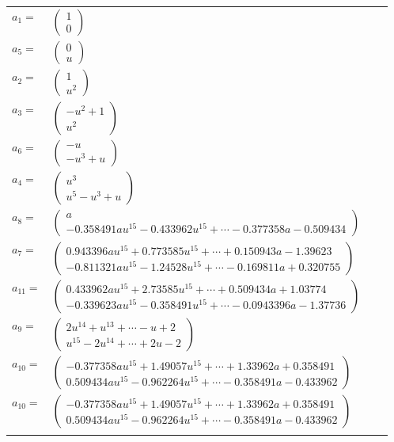 \documentclass[1p]{elsarticle_modified}
\theoremstyle{definition}
\begin{document}
\begin{tabular}{m{7pt} m{180pt} m{7pt} m{180pt} }
\flushright $a_{1}=$&$\begin{pmatrix}1\\0\end{pmatrix}$ \\
\flushright $a_{5}=$&$\begin{pmatrix}0\\u\end{pmatrix}$ \\
\flushright $a_{2}=$&$\begin{pmatrix}1\\u^2\end{pmatrix}$ \\
\flushright $a_{3}=$&$\begin{pmatrix}- u^2+1\\u^2\end{pmatrix}$ \\
\flushright $a_{6}=$&$\begin{pmatrix}- u\\- u^3+u\end{pmatrix}$ \\
\flushright $a_{4}=$&$\begin{pmatrix}u^3\\u^5- u^3+u\end{pmatrix}$ \\
\flushright $a_{8}=$&$\begin{pmatrix}a\\-0.358491 a u^{15}-0.433962 u^{15}+\cdots-0.377358 a-0.509434\end{pmatrix}$ \\
\flushright $a_{7}=$&$\begin{pmatrix}0.943396 a u^{15}+0.773585 u^{15}+\cdots+0.150943 a-1.39623\\-0.811321 a u^{15}-1.24528 u^{15}+\cdots-0.169811 a+0.320755\end{pmatrix}$ \\
\flushright $a_{11}=$&$\begin{pmatrix}0.433962 a u^{15}+2.73585 u^{15}+\cdots+0.509434 a+1.03774\\-0.339623 a u^{15}-0.358491 u^{15}+\cdots-0.0943396 a-1.37736\end{pmatrix}$ \\
\flushright $a_{9}=$&$\begin{pmatrix}2 u^{14}+u^{13}+\cdots- u+2\\u^{15}-2 u^{14}+\cdots+2 u-2\end{pmatrix}$ \\
\flushright $a_{10}=$&$\begin{pmatrix}-0.377358 a u^{15}+1.49057 u^{15}+\cdots+1.33962 a+0.358491\\0.509434 a u^{15}-0.962264 u^{15}+\cdots-0.358491 a-0.433962\end{pmatrix}$\\ \flushright $a_{10}=$&$\begin{pmatrix}-0.377358 a u^{15}+1.49057 u^{15}+\cdots+1.33962 a+0.358491\\0.509434 a u^{15}-0.962264 u^{15}+\cdots-0.358491 a-0.433962\end{pmatrix}$\\&\end{tabular}
\end{document}
